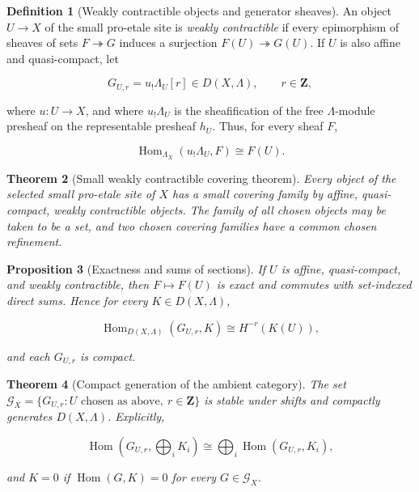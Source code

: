 \documentclass[10pt]{article}
\newtheorem{theorem}{Theorem}[section]
\newtheorem{proposition}[theorem]{Proposition}
\theoremstyle{definition}
\newtheorem{definition}[theorem]{Definition}
\newcommand{\HomD}{\operatorname{Hom}}
\begin{document}
\begin{definition}[Weakly contractible objects and generator sheaves]
An object \(U\to X\) of the small pro-etale site is \emph{weakly
contractible} if every epimorphism of sheaves of sets \(F\twoheadrightarrow G\)
induces a surjection \(F(U)\twoheadrightarrow G(U)\).  If \(U\) is also
affine and quasi-compact, let

\[
 G_{U,r}=u_!\Lambda_U[r]\in D(X,\Lambda),\qquad r\in\mathbf Z,
\]

where \(u:U\to X\), and where \(u_!\Lambda_U\) is the sheafification of the
free \(\Lambda\)-module presheaf on the representable presheaf \(h_U\).
Thus, for every sheaf \(F\),

\[
 \operatorname{Hom}_{\Lambda_X}(u_!\Lambda_U,F)\cong F(U).
\]
\end{definition}

\begin{theorem}[Small weakly contractible covering theorem]
Every object of the selected small pro-etale site of \(X\) has a small
covering family by affine, quasi-compact, weakly contractible objects.  The
family of all chosen objects may be taken to be a set, and two chosen
covering families have a common chosen refinement.
\end{theorem}

\begin{proposition}[Exactness and sums of sections]
If \(U\) is affine, quasi-compact, and weakly contractible, then
\(F\mapsto F(U)\) is exact and commutes with set-indexed direct sums.  Hence
for every \(K\in D(X,\Lambda)\),

\[
 \HomD_{D(X,\Lambda)}(G_{U,r},K)\cong H^{-r}(K(U)),
\]

and each \(G_{U,r}\) is compact.
\end{proposition}

\begin{theorem}[Compact generation of the ambient category]
The set
\(
 \mathcal G_X=\{G_{U,r}:U\text{ chosen as above},\ r\in\mathbf Z\}
\)
is stable under shifts and compactly generates \(D(X,\Lambda)\).  Explicitly,

\[
 \HomD(G_{U,r},\textstyle\bigoplus_iK_i)
 \cong\bigoplus_i\HomD(G_{U,r},K_i),
\]

and \(K=0\) if \(\HomD(G,K)=0\) for every \(G\in\mathcal G_X\).
\end{theorem}
\end{document}

